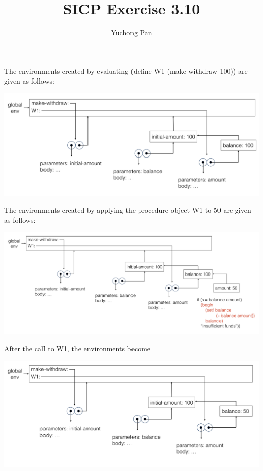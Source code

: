 \documentclass[11pt, oneside]{article}
\title{SICP Exercise 3.10}
\author{Yuchong Pan}
\begin{document}
\maketitle

The environments created by evaluating (define W1 (make-withdraw 100)) are given as follows:

\begin{center}
    \includegraphics[width=15cm]{ex-3.10-1.png}
\end{center}

The environments created by applying the procedure object W1 to 50 are given as follows:

\begin{center}
    \includegraphics[width=15cm]{ex-3.10-2.png}
\end{center}

After the call to W1, the environments become

\begin{center}
    \includegraphics[width=15cm]{ex-3.10-3.png}
\end{center}
\end{document}
